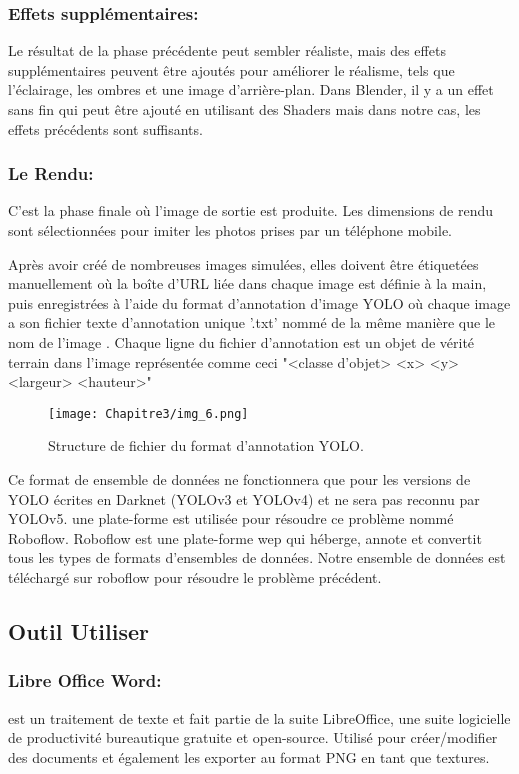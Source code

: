           \subsubsection{Effets supplémentaires:} Le résultat de la phase précédente peut sembler réaliste, mais des effets supplémentaires peuvent être ajoutés pour améliorer le réalisme, tels que l'éclairage, les ombres et une image d'arrière-plan. Dans Blender, il y a un effet sans fin qui peut être ajouté en utilisant des Shaders mais dans notre cas, les effets précédents sont suffisants.
          \subsubsection{Le Rendu:} C'est la phase finale où l'image de sortie est produite. Les dimensions de rendu sont sélectionnées pour imiter les photos prises par un téléphone mobile.
          

          Après avoir créé de nombreuses images simulées, elles doivent être étiquetées manuellement où la boîte d'URL liée dans chaque image est définie à la main, puis enregistrées à l'aide du format d'annotation d'image YOLO où chaque image a son fichier texte d'annotation unique '.txt' nommé de la même manière que le nom de l'image . Chaque ligne du fichier d'annotation est un objet de vérité terrain dans l'image représentée comme ceci "<classe d'objet> <x> <y> <largeur> <hauteur>"
          \begin{figure}[H]
               \centering
               \texttt{[image: Chapitre3/img\_6.png]}
               \caption{Structure de fichier du format d'annotation YOLO.}
               \label{img7}
               \end{figure}

          Ce format de ensemble de données ne fonctionnera que pour les versions de YOLO écrites en Darknet (YOLOv3 et YOLOv4) et ne sera pas reconnu par YOLOv5. une plate-forme est utilisée pour résoudre ce problème nommé Roboflow. Roboflow est une plate-forme wep qui héberge, annote et convertit tous les types de formats d'ensembles de données. Notre ensemble de données est téléchargé sur roboflow pour résoudre le problème précédent.

          \subsection{Outil Utiliser}
               \subsubsection{Libre Office Word:} est un traitement de texte et fait partie de la suite LibreOffice, une suite logicielle de productivité bureautique gratuite et open-source. Utilisé pour créer/modifier des documents et également les exporter au format PNG en tant que textures.
